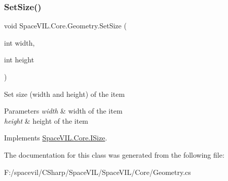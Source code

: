 \subsubsection{\texorpdfstring{Set\+Size()}{SetSize()}}
{\footnotesize\ttfamily void Space\+V\+I\+L.\+Core.\+Geometry.\+Set\+Size (\begin{DoxyParamCaption}\item[{int}]{width,  }\item[{int}]{height }\end{DoxyParamCaption})\hspace{0.3cm}{\ttfamily [inline]}}



Set size (width and height) of the item 


\begin{DoxyParams}{Parameters}
{\em width} & width of the item \\
\hline
{\em height} & height of the item \\
\hline
\end{DoxyParams}


Implements \mbox{\hyperlink{interface_space_v_i_l_1_1_core_1_1_i_size}{Space\+V\+I\+L.\+Core.\+I\+Size}}.



The documentation for this class was generated from the following file\+:\begin{DoxyCompactItemize}
\item 
F\+:/spacevil/\+C\+Sharp/\+Space\+V\+I\+L/\+Space\+V\+I\+L/\+Core/Geometry.\+cs\end{DoxyCompactItemize}
